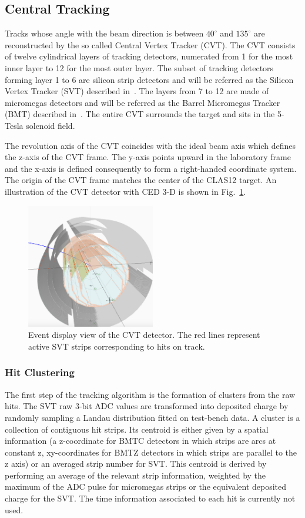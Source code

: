 \subsection{Central Tracking}\label{sec:cvt}

Tracks whose angle with the beam direction is between $40^\circ$ and $135^\circ$ are reconstructed by the so called
Central Vertex Tracker (CVT). The CVT consists of twelve cylindrical layers of tracking detectors, numerated from 1 for
the most inner layer to 12 for the most outer layer. The subset of tracking detectors forming layer 1 to 6 are silicon
strip detectors and will be referred as the Silicon Vertex Tracker (SVT) described in~\cite{svt-nim}. The layers from 7
to 12 are made of micromegas detectors and will be referred as the Barrel Micromegas Tracker (BMT) described
in~\cite{mm-nim}. The entire CVT surrounds the target and sits in the 5-Tesla solenoid field.

The revolution axis of the CVT coincides with the ideal beam axis which defines the z-axis of the CVT frame. The y-axis
points upward in the laboratory frame and the x-axis is defined consequently to form a right-handed coordinate system. The origin of the CVT frame matches the center of the CLAS12 target.
An illustration of the CVT detector with CED 3-D is shown in Fig.~\ref{fig:cvt}.

\begin{figure}
\centering
\includegraphics[width=0.5\textwidth]{pics/cvt.png}
\caption{Event display view of the CVT detector. The red lines represent active SVT strips corresponding to hits on track. 
}
\label{fig:cvt}
\end{figure}

\subsubsection{Hit Clustering}
The first step of the tracking algorithm is the formation of clusters from the raw hits. The SVT raw 3-bit ADC values
are transformed into deposited charge by randomly sampling a Landau distribution fitted on test-bench data. A cluster
is a collection of contiguous hit strips. Its centroid is either given by a spatial information (a z-coordinate for
BMTC detectors in which strips are arcs at constant z, xy-coordinates for BMTZ detectors in which strips are parallel to the z axis) or an averaged strip number for SVT. This centroid is derived by performing an average of
the relevant strip information, weighted by the maximum of the ADC pulse for micromegas strips or the equivalent
deposited charge for the SVT.
The time information associated to each hit is currently not used.

